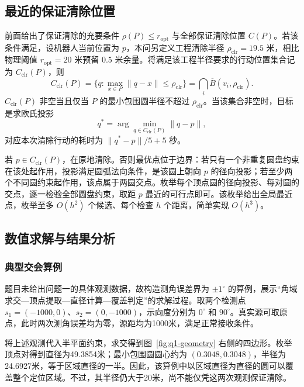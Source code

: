 \documentclass[UTF8,a4paper,zihao=-4,fontset=none]{ctexart}
\begin{document}
\subsection{最近的保证清除位置}

前面给出了保证清除的充要条件 \(\rho(P)\le r_{\mathrm{opt}}\) 与全部保证清除位置 \(C(P)\)。若该条件满足，设机器人当前位置为 \(p\)，本问另定义工程清除半径 \(\rho_{\mathrm{clr}}=19.5\) 米，相比物理阈值 \(r_{\mathrm{opt}}=20\) 米预留 \(0.5\) 米余量。将满足该工程半径要求的行动位置集合记为 \(C_{\mathrm{clr}}(P)\)，则
\begin{equation}
  C_{\mathrm{clr}}(P)=\{q:\max_{x\in P}\lVert q-x\rVert\le\rho_{\mathrm{clr}}\}
  =\bigcap_{i}\overline{B}(v_i,\rho_{\mathrm{clr}}).
  \label{eq:clear-proj}
\end{equation}
\(C_{\mathrm{clr}}(P)\) 非空当且仅当 \(P\) 的最小包围圆半径不超过 \(\rho_{\mathrm{clr}}\)。当该集合非空时，目标是求欧氏投影
\begin{equation}
  q^*=\arg\min_{q\in C_{\mathrm{clr}}(P)}\lVert q-p\rVert ,
\end{equation}
对应本次清除行动的耗时为 \(\lVert q^*-p\rVert/5+5\) 秒。

若 \(p\in C_{\mathrm{clr}}(P)\)，在原地清除。否则最优点位于边界：若只有一个非重复圆盘约束在该处起作用，投影满足圆弧法向条件，是该圆上朝向 \(p\) 的径向投影；若至少两个不同圆约束起作用，该点属于两圆交点。枚举每个顶点圆的径向投影、每对圆的交点，逐一检验全部圆盘约束，取距 \(p\) 最近的可行点即可。该枚举给出全局最近点，枚举至多 \(O(h^2)\) 个候选、每个检查 \(h\) 个距离，简单实现 \(O(h^3)\)。

\subsection{数值求解与结果分析}

\subsubsection{典型交会算例}

题目未给出问题一的具体观测数据，故构造测角误差界为 \(\pm1^\circ\) 的算例，展示“角域求交—顶点提取—直径计算—覆盖判定”的求解过程。取两个检测点 \(s_1=(-1000,0)\)、\(s_2=(0,-1000)\)，示向度分别为 \(0^\circ\) 和 \(90^\circ\)。真实源可取原点，此时两次测角误差均为零，源距均为1000米，满足正常接收条件。

将上述观测代入半平面约束，求交得到图~\ref{fig:q1-geometry} 右侧的四边形。枚举顶点对得到直径为49.3854米；最小包围圆圆心约为 \((0.3048,0.3048)\)，半径为24.6927米，等于区域直径的一半。因此，该算例中以区域直径为直径的圆可以覆盖整个定位区域。不过，其半径仍大于20米，尚不能仅凭这两次观测保证清除。
\end{document}
